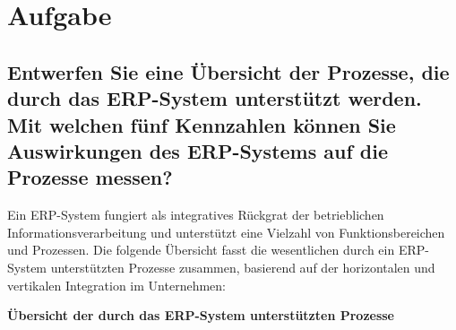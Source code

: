 
\chapter{Aufgabe}
\label{chap:5 Aufgabe}
\thispagestyle{fancy}
\section*{Entwerfen Sie eine Übersicht der Prozesse, die durch das \acs{ERP}-System unterstützt werden. Mit welchen fünf Kennzahlen können Sie Auswirkungen des \acs{ERP}-Systems auf die Prozesse messen?} \par Ein \acs{ERP}-System fungiert als integratives Rückgrat der betrieblichen Informationsverarbeitung und unterstützt eine Vielzahl von Funktionsbereichen und Prozessen. \cite{109}\cite{110} Die folgende Übersicht fasst die wesentlichen durch ein \acs{ERP}-System unterstützten Prozesse zusammen, basierend auf der horizontalen und vertikalen Integration im Unternehmen: \cite{53}\cite{111} \par \textbf{Übersicht der durch das \acs{ERP}-System unterstützten Prozesse}
